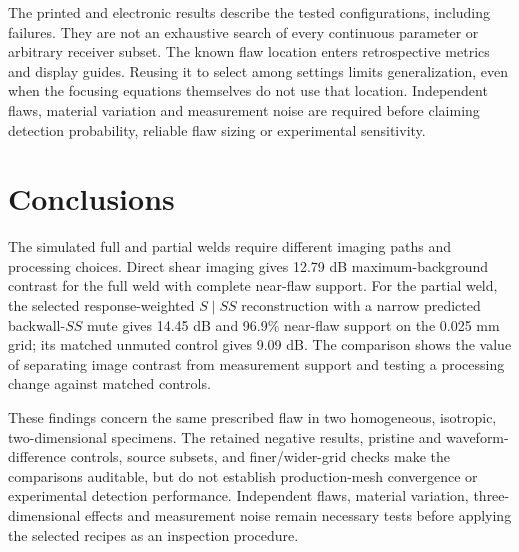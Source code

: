 \documentclass[11pt]{article}
\begin{document}
The printed and electronic results describe the tested configurations, including failures. They are not an exhaustive search of every continuous parameter or arbitrary receiver subset. The known flaw location enters retrospective metrics and display guides. Reusing it to select among settings limits generalization, even when the focusing equations themselves do not use that location. Independent flaws, material variation and measurement noise are required before claiming detection probability, reliable flaw sizing or experimental sensitivity.

\FloatBarrier

\section{Conclusions}
The simulated full and partial welds require different imaging paths and processing choices. Direct shear imaging gives 12.79 dB maximum-background contrast for the full weld with complete near-flaw support. For the partial weld, the selected response-weighted $S\mid SS$ reconstruction with a narrow predicted backwall-$SS$ mute gives 14.45 dB and 96.9\% near-flaw support on the 0.025 mm grid; its matched unmuted control gives 9.09 dB. The comparison shows the value of separating image contrast from measurement support and testing a processing change against matched controls.

These findings concern the same prescribed flaw in two homogeneous, isotropic, two-dimensional specimens. The retained negative results, pristine and waveform-difference controls, source subsets, and finer/wider-grid checks make the comparisons auditable, but do not establish production-mesh convergence or experimental detection performance. Independent flaws, material variation, three-dimensional effects and measurement noise remain necessary tests before applying the selected recipes as an inspection procedure.

\FloatBarrier


\end{document}
